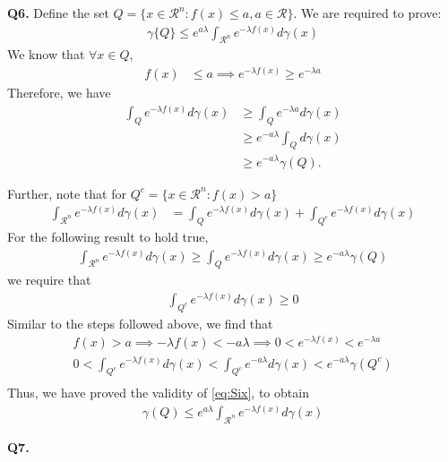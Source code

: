 \documentclass[11pt]{article}
\begin{document}
\textbf{Q6. }
Define the set $Q = \{x\in \mathcal{R}^n : f(x) \leq a, a\in \mathcal{R} \}$. We are required to prove: 
\begin{align}
\gamma\{Q \} \leq e^{a \lambda}\int_{\mathcal{R}^n} e^{-\lambda f(x)} d\gamma(x)\label{eq:MainInequality}
\end{align}
We know that $\forall x \in Q$,
\begin{align*}
f(x) &\leq a \implies e^{-\lambda f(x)} \geq  e^{-\lambda a}
\end{align*}
Therefore, we have
\begin{align*}
\int_{Q}e^{-\lambda f(x)} d\gamma(x) &\geq \int_{Q}e^{-\lambda a} d\gamma(x)\\
&\geq e^{-a \lambda }\int_{Q} d\gamma(x)\\
&\geq e^{-a \lambda }\gamma(Q).
\end{align*}

Further, note that for $ Q^c =\{x\in \mathcal{R}^n : f(x) > a \} $
\begin{align*}
\int_{\mathcal{R}^n}e^{-\lambda f(x)} d\gamma(x) &= \int_{Q}e^{-\lambda f(x)} d\gamma(x) + \int_{Q^c}e^{-\lambda f(x)} d\gamma(x) 
\end{align*}
For the following result to hold true, 
\begin{align}
\int_{\mathcal{R}^n}e^{-\lambda f(x)} d\gamma(x) \geq \int_{Q}e^{-\lambda f(x)} d\gamma(x) \geq e^{-a \lambda }\gamma(Q) \label{eq:Six}
\end{align}
we require that 
\begin{align*}
\int_{Q^c}e^{-\lambda f(x)} d\gamma(x) \geq 0
\end{align*}
Similar to the steps followed above, we find that
\begin{align*}
f(x) > a \implies -\lambda f(x) < -a\lambda \implies 0 < e^{-\lambda f(x)} <  e^{-\lambda a}\\
0 < \int_{Q^c}e^{-\lambda f(x)} d\gamma(x) < \int_{Q^c}e^{-a \lambda} d\gamma(x) < e^{-a \lambda} \gamma(Q^c)\\
\end{align*}
Thus, we have proved the validity of \eqref{eq:Six}, to obtain
\begin{align*}
\gamma(Q) \leq e^{a \lambda }\int_{\mathcal{R}^n}e^{-\lambda f(x)} d\gamma(x)
\end{align*}

\hrulefill \vspace{2 pt}

\textbf{Q7. }
\end{document}
